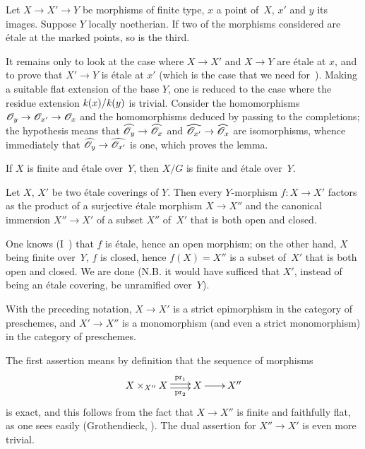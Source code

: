\begin{lemma}
\label{V.3.3} Let $X \to X' \to
Y$ be morphisms of finite type, $x$ a point of~$X$, $x'$ and $y$ its
images. Suppose $Y$ locally noetherian. If two of the
morphisms considered are \'etale at the marked points, so is
the third.
\end{lemma}

It remains only to look at the case where $X \to X'$ and $X \to
Y$ are \'etale at $x$, and to prove that $X' \to Y$ is \'etale at $x'$ (which
is the case that we need
for~). Making a suitable flat extension of the base
$Y$, one is reduced to the case where the residue extension
$\mathit{k}(x)/\mathit{k}(y)$
is trivial. Consider the homomorphisms
$\cal{O}_y \to \cal{O}_{x'} \to \cal{O}_x$ and the homomorphisms
deduced by passing to the completions; the hypothesis
means that $\hat{\cal{O}_y} \to \hat{\cal{O}_x}$ and
$\hat{\cal{O}_{x'}} \to \hat{\cal{O}_x}$ are isomorphisms,
whence immediately that $\hat{\cal{O}_y} \to \hat{\cal{O}_{x'}}$
is one, which proves the lemma.

\begin{corollary}
\label{V.3.4} If $X$ is finite and \'etale over~$Y$, then $X/G$
is finite and \'etale over~$Y$.
\end{corollary}

\begin{proposition}
\label{V.3.5} Let $X$, $X'$ be two \'etale coverings of
$Y$. Then every $Y$-morphism $f \colon X \to X'$ factors as the
product of a surjective \'etale morphism $X \to X''$ and
the canonical immersion $X'' \to X'$ of a subset $X''$ of~$X'$ that is
both open and closed.
\end{proposition}

One knows (I~) that $f$ is \'etale, hence an open
morphism; on the other hand, $X$ being finite over~$Y$, $f$ is closed,
hence $f(X)=X''$ is a subset of~$X'$ that is both open and closed. We are done (N.B. it would have sufficed that $X'$, instead of being an
\'etale covering, be unramified over~$Y$).

\begin{corollary}
\label{V.3.6} With the preceding notation, $X \to X'$
is a strict epimorphism in the category of
preschemes, and $X' \to X''$ is a monomorphism (and even
a strict monomorphism) in the category of preschemes.
\end{corollary}

The first assertion means by definition that the sequence of
morphisms
$$
\xymatrix@C=.7cm{X \times_{X''} X \ar@<2pt>[r]^-{\pr_1}
\ar@<-2pt>[r]_-{\pr_2} & X \ar[r] & X''}
$$
is exact, and this follows from the fact that $X \to X''$ is finite and
faithfully flat, as one sees easily (\cf Grothendieck, \loccit). The dual assertion for $X'' \to X'$ is even more trivial.


